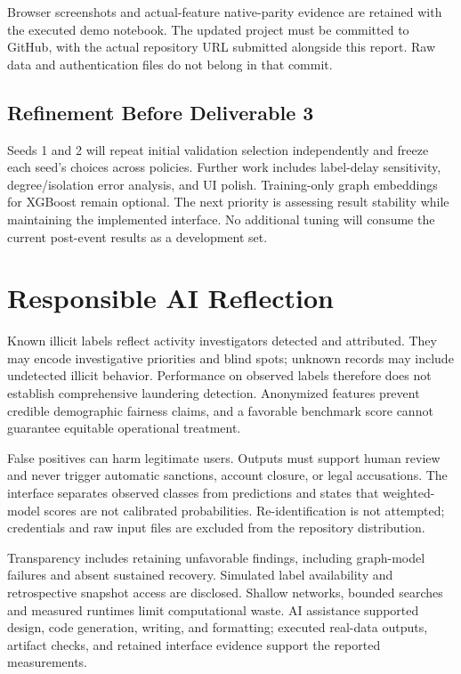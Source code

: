 \documentclass[conference]{IEEEtran}
\begin{document}
Browser screenshots and actual-feature native-parity evidence are retained with the executed demo notebook. The updated project must be committed to GitHub, with the actual repository URL submitted alongside this report. Raw data and authentication files do not belong in that commit.

\subsection{Refinement Before Deliverable 3}
Seeds 1 and 2 will repeat initial validation selection independently and freeze each seed's choices across policies. Further work includes label-delay sensitivity, degree/isolation error analysis, and UI polish. Training-only graph embeddings for XGBoost remain optional. The next priority is assessing result stability while maintaining the implemented interface. No additional tuning will consume the current post-event results as a development set.

\section{Responsible AI Reflection}
Known illicit labels reflect activity investigators detected and attributed. They may encode investigative priorities and blind spots; unknown records may include undetected illicit behavior. Performance on observed labels therefore does not establish comprehensive laundering detection. Anonymized features prevent credible demographic fairness claims, and a favorable benchmark score cannot guarantee equitable operational treatment.

False positives can harm legitimate users. Outputs must support human review and never trigger automatic sanctions, account closure, or legal accusations. The interface separates observed classes from predictions and states that weighted-model scores are not calibrated probabilities. Re-identification is not attempted; credentials and raw input files are excluded from the repository distribution.

Transparency includes retaining unfavorable findings, including graph-model failures and absent sustained recovery. Simulated label availability and retrospective snapshot access are disclosed. Shallow networks, bounded searches and measured runtimes limit computational waste. AI assistance supported design, code generation, writing, and formatting; executed real-data outputs, artifact checks, and retained interface evidence support the reported measurements.
\end{document}

